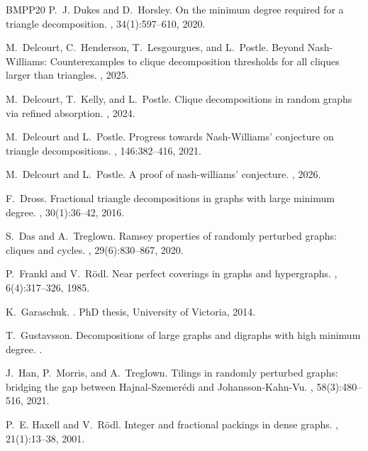 \documentclass[11pt,reqno]{amsart}
\theoremstyle{definition}
\theoremstyle{remark}
\begin{document}
\begin{thebibliography}{BMPP20}
P.~J. Dukes and D.~Horsley.
\newblock On the minimum degree required for a triangle decomposition.
, 34(1):597--610, 2020.

M.~Delcourt, C.~Henderson, T.~Lesgourgues, and L.~Postle.
\newblock Beyond {N}ash-{W}illiams: Counterexamples to clique decomposition thresholds for all cliques larger than triangles.
, 2025.

M.~Delcourt, T.~Kelly, and L.~Postle.
\newblock Clique decompositions in random graphs via refined absorption.
, 2024.

M.~Delcourt and L.~Postle.
\newblock Progress towards {N}ash-{W}illiams' conjecture on triangle decompositions.
, 146:382--416, 2021.

M.~Delcourt and L.~Postle.
\newblock A proof of nash-williams' conjecture.
, 2026.

F.~Dross.
\newblock Fractional triangle decompositions in graphs with large minimum degree.
, 30(1):36--42, 2016.

S.~Das and A.~Treglown.
\newblock Ramsey properties of randomly perturbed graphs: cliques and cycles.
, 29(6):830--867, 2020.

P.~Frankl and V.~R\"{o}dl.
\newblock Near perfect coverings in graphs and hypergraphs.
, 6(4):317--326, 1985.

K.~Garaschuk.
.
\newblock PhD thesis, University of Victoria, 2014.

T.~Gustavsson.
\newblock Decompositions of large graphs and digraphs with high minimum degree.
.

J.~Han, P.~Morris, and A.~Treglown.
\newblock Tilings in randomly perturbed graphs: bridging the gap between {H}ajnal-{S}zemer\'{e}di and {J}ohansson-{K}ahn-{V}u.
, 58(3):480--516, 2021.

P.~E. Haxell and V.~R\"{o}dl.
\newblock Integer and fractional packings in dense graphs.
, 21(1):13--38, 2001.


\end{thebibliography}
\end{document}
